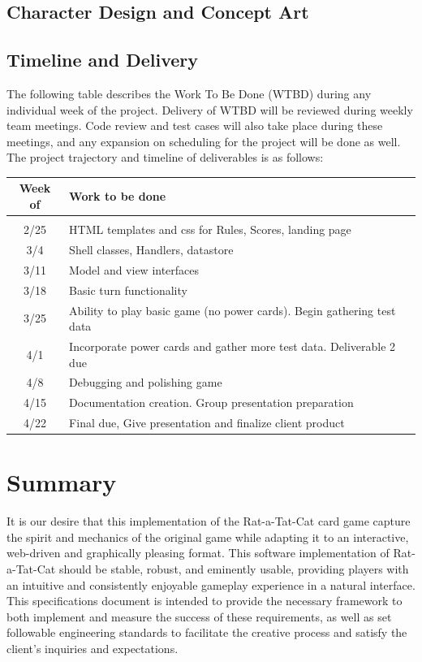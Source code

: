 \documentclass[12pt]{IEEEtran}
\begin{document}
\subsection{Character Design and Concept Art}
\label{subsec:cdesign}

\subsection{Timeline and Delivery}
\label{subsec:timeline}

	The following table describes the Work To Be Done (WTBD) during any individual week of the project. Delivery of WTBD will be reviewed during weekly team meetings. Code review and test cases will also take place during these meetings, and any expansion on scheduling for the project will be done as well. The project trajectory and timeline of deliverables is as follows:

	\begin{center}
		\begin{tabular}{ c |  p{} }
			Week of & Work to be done\\\hline
			&\\
			2/25 & HTML templates and css for Rules, Scores, landing page\\
			3/4 & Shell classes, Handlers, datastore\\
			3/11 & Model and view interfaces\\
			3/18 & Basic turn functionality\\
			3/25 &  Ability to play basic game (no power cards). Begin gathering test data\\
			4/1 & Incorporate power cards and gather more test data. Deliverable 2 due\\
			4/8 & Debugging and polishing game\\
			4/15 & Documentation creation. Group presentation preparation\\
			4/22 & Final due, Give presentation and finalize client product\\
		\end{tabular}
	\end{center}

\section{Summary}
\label{sec:summary}

	It is our desire that this implementation of the Rat-a-Tat-Cat card game capture the spirit and mechanics of the original game while adapting it to an interactive, web-driven and graphically pleasing format. This software implementation of Rat-a-Tat-Cat should be stable, robust, and eminently usable, providing players with an intuitive and consistently enjoyable gameplay experience in a natural interface. This specifications document is intended to provide the necessary framework to both implement and measure the success of these requirements, as well as set followable engineering standards to facilitate the creative process and satisfy the client’s inquiries and expectations.
\end{document}
